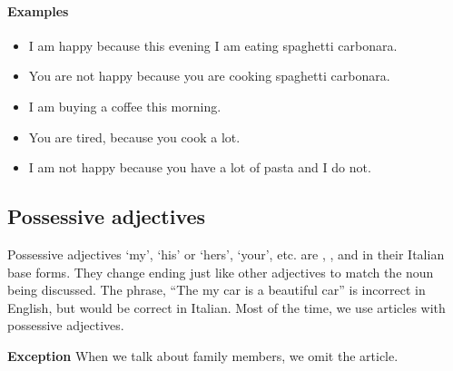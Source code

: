 \paragraph{Examples}
\begin{itemize}
    \item I am happy because this evening I am eating spaghetti carbonara. \\
    \item You are not happy because you are cooking spaghetti carbonara. \\
    \item I am buying a coffee this morning. \\
    \item You are tired, because you cook a lot. \\
    \item I am not happy because you have a lot of pasta and I do not. \\
\end{itemize}

\newpage
\subsection{Possessive adjectives}
Possessive adjectives `my', `his' or `hers', `your', etc. are , , 
and  in their Italian base forms. They change ending just like other adjectives 
to match the noun being discussed. The phrase, ``The my car is a beautiful car'' is 
incorrect in English, but would be correct in Italian. Most of the time, we use articles 
with possessive adjectives. 
\begin{mdframed}
    \textbf{Exception} When we talk about family members, we omit the article.
\end{mdframed}

